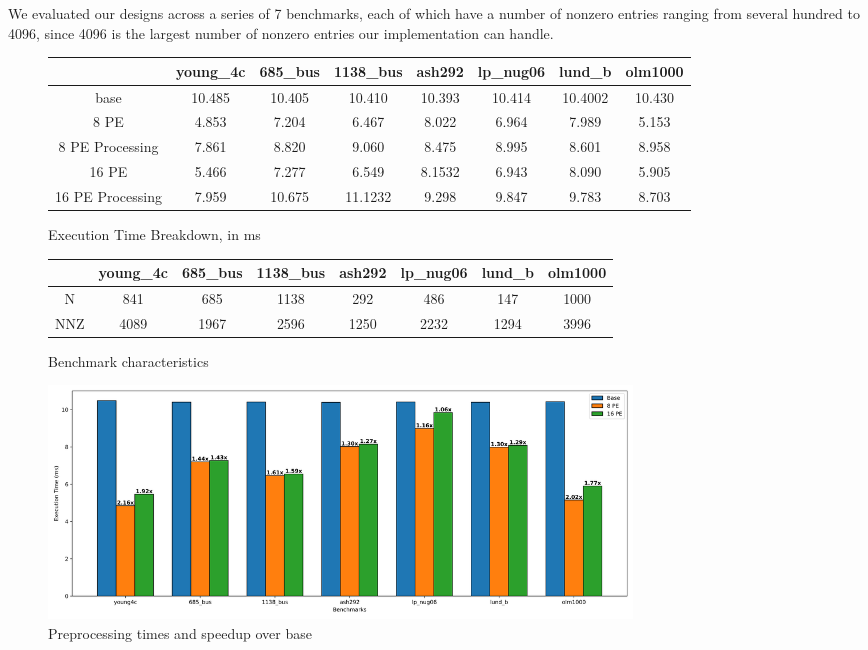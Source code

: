 \documentclass[10pt]{article}
\begin{document}
\noindent We evaluated our designs across a series of 7 benchmarks, each of which have a number of nonzero entries ranging
from several hundred to 4096, since 4096 is the largest number of nonzero entries our implementation can handle. \newline

\begin{figure}[h!]
  \centering
  \begin{tabular} {| c | c | c | c | c | c | c | c |}
    \hline
                    & young\_4c & 685\_bus & 1138\_bus & ash292 & lp\_nug06 & lund\_b & olm1000 \\
    \hline
    base            & 10.485    & 10.405   & 10.410    & 10.393 & 10.414    & 10.4002 & 10.430 \\
    \hline
    8 PE            & 4.853     & 7.204    & 6.467     & 8.022  & 6.964     & 7.989   & 5.153 \\
    \hline
    8 PE Processing & 7.861     & 8.820    & 9.060     & 8.475  & 8.995     & 8.601   & 8.958 \\
    \hline
    16 PE           & 5.466     & 7.277    & 6.549     & 8.1532 & 6.943     & 8.090   & 5.905 \\
    \hline
    16 PE Processing& 7.959     & 10.675   &   11.1232 & 9.298  & 9.847     & 9.783   & 8.703 \\
    \hline
  \end{tabular}
  \caption{Execution Time Breakdown, in ms}
  \label{fig:exec_times}
\end{figure}

\begin{figure}[h!]
  \centering
  \begin{tabular} {| c | c | c | c | c | c | c | c |}
    \hline
         & young\_4c & 685\_bus & 1138\_bus & ash292 & lp\_nug06 & lund\_b & olm1000 \\
    \hline
    N    & 841       & 685      & 1138      & 292    & 486       & 147     & 1000 \\
    \hline
    NNZ  & 4089      & 1967     &  2596     & 1250   & 2232      & 1294    & 3996 \\
    \hline
  \end{tabular}
  \caption{Benchmark characteristics}
  \label{fig:bench_info}
\end{figure}

\begin{figure}[h!]
  \centering
  \includegraphics[width=0.75\textwidth]{speedup.png}
  \caption{Preprocessing times and speedup over base}
  \label{fig:speedups}
\end{figure}
\end{document}
